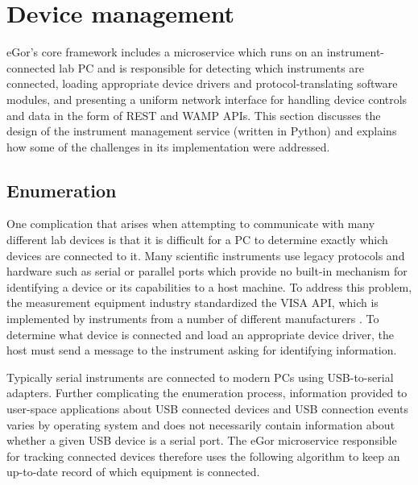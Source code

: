 \documentclass[../thesis]{subfiles}
\begin{document}
\section{Device management}
eGor's core framework includes a microservice which runs on an
instrument-connected lab PC and is responsible for detecting which
instruments are connected, loading appropriate device drivers and
protocol-translating software modules, and presenting a uniform
network interface for handling device controls and data in the form
of \gls{REST} and \gls{WAMP} \glspl{API}. This section discusses the
design of the instrument management service (written in Python) and
explains how some of the challenges in its implementation were
addressed.

\subsection{Enumeration}
One complication that arises when attempting to communicate with many
different lab devices is that it is difficult for a PC to determine
exactly which devices are connected to it. Many scientific instruments
use legacy protocols and hardware such as serial or parallel ports
which provide no built-in mechanism for identifying a device or its
capabilities to a host machine. To address this problem, the
measurement equipment industry standardized the \gls{VISA} \gls{API},
which is implemented by instruments from a number of different
manufacturers \cite{VISA}. To determine what device is connected and
load an appropriate device driver, the host must send a message to the
instrument asking for identifying information.

Typically serial instruments are connected to modern PCs using
USB-to-serial adapters. Further complicating the enumeration process,
information provided to user-space applications about USB connected
devices and USB connection events varies by operating system and does
not necessarily contain information about whether a given USB device
is a serial port. The eGor microservice responsible for tracking
connected devices therefore uses the following algorithm to keep an
up-to-date record of which equipment is connected.
\end{document}
